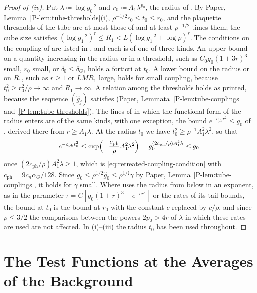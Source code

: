 \documentclass[11pt]{preprint}
\numberwithin{equation}{section}
\theoremstyle{definition}
\theoremstyle{remark}
\theoremstyle{plain}
\begin{document}
\begin{proof}[Proof of (iv)]
Put $\lambda \coloneqq \log g_0^{-2}$ and $r_0 \coloneqq A_1\lambda^{p_0}$, the radius of \cite[(D.1)]{WilsonFirstStep}. By Paper, Lemma~\ref{P-lem:tube-thresholds}(i), $\rho^{-1/2}r_0 \leq t_0 \leq r_0$, and the plaquette thresholds of the tube are at most those of \cite{WilsonFirstStep} and at least $\rho^{-1/2}$ times them; the cube size satisfies $(\log g_1^{-2})^r \leq R_1 < L(\log g_1^{-2} + \log\rho)^r$. The conditions on the coupling of \cite{WilsonFirstStep} are listed in \cite[Appendix~B.8]{WilsonFirstStep}, and each is of one of three kinds. An upper bound on a quantity increasing in the radius or in a threshold, such as $C_0g_0(1 + 3r)^3$ small, $\varepsilon_0$ small, or $\delta_0 \leq \delta_G$, holds a fortiori at $t_0$. A lower bound on the radius or on $R_1$, such as $r \geq 1$ or $LMR_1$ large, holds for small coupling, because $t_0^2 \geq r_0^2/\rho \to \infty$ and $R_1 \to \infty$. A relation among the thresholds holds as printed, because the sequence $(\hat g_j)$ satisfies \cite[(2.6)--(2.8)]{BalabanCRE} (Paper, Lemmata~\ref{P-lem:tube-couplings} and~\ref{P-lem:tube-thresholds}). The lines of \cite{WilsonFirstStep} in which the functional form of the radius enters are of the same kinds, with one exception, the bound $e^{-c_{\mathrm{ph}}r^2} \leq g_0$ of \cite[(9.29)(iii)]{WilsonFirstStep}, derived there from $r \geq A_1\lambda$. At the radius $t_0$ we have $t_0^2 \geq \rho^{-1}A_1^2\lambda^2$, so that
\[
    e^{-c_{\mathrm{ph}}t_0^2} \leq \exp\Bigl(-\frac{c_{\mathrm{ph}}}{\rho}A_1^2\lambda^2\Bigr) = g_0^{(2c_{\mathrm{ph}}/\rho)A_1^2\lambda} \leq g_0
\]
once $(2c_{\mathrm{ph}}/\rho)A_1^2\lambda \geq 1$, which is \eqref{eq:retreated-coupling-condition} with $c_{\mathrm{ph}} = 9c_n\alpha_G/128$. Since $g_0 \leq \rho^{1/2}\hat g_0 \leq \rho^{1/2}\gamma$ by Paper, Lemma~\ref{P-lem:tube-couplings}, it holds for $\gamma$ small. Where \cite{WilsonFirstStep} uses the radius from below in an exponent, as in the parameter $\tau = C[g_0(1 + r)^3 + e^{-cr^2}]$ or the rates of its tail bounds, the bound at $t_0$ is the bound at $r_0$ with the constant $c$ replaced by $c/\rho$, and since $\rho \leq 3/2$ the comparisons between the powers $2p_0 > 4r$ of $\lambda$ in which these rates are used are not affected. In (i)--(iii) the radius $t_0$ has been used throughout.
\end{proof}

\section{The Test Functions at the Averages of the Background}\label{sec:band}
\end{document}
